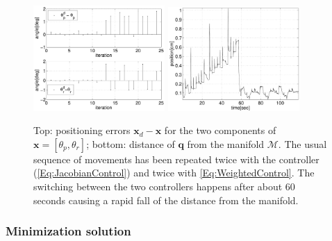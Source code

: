 \documentclass[conference]{IEEEtran}
\numberwithin{equation}{section}
\newcommand{\q}{\mathbf{q}}
\newcommand{\x}{\mathbf{x}}
\begin{document}
\begin{figure}[tbp]
\centering 
\includegraphics[width=50mm]{image/ErrorsJacobianAndComprormise.pdf} 
\includegraphics[width=50mm]{image/ManifoldDistanceJacobianAndComprormise.pdf} 
\caption{Top: positioning errors $\x_d - \x$ for the two components of $\x = [\theta_p, \theta_r]$; bottom: distance of $\q$ from the manifold $\mathcal M$. The usual sequence of movements has been repeated twice with the controller (\ref{Eq:JacobianControl}) and twice with \eqref{Eq:WeightedControl}. The switching between the two controllers happens after about 60 seconds causing a rapid fall of the distance from the manifold.} 
\label{Fig:ManifoldDistanceJacobianAndCompromise}
\end{figure}

\subsubsection{Minimization solution} \label{Sec:MinimizationSolution}
\end{document}
